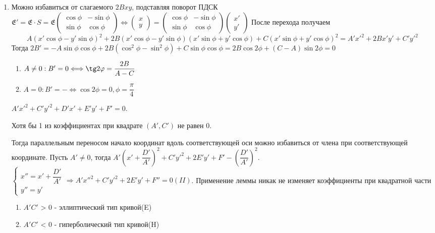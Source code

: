 \begin{enumerate}
	\item Можно избавиться от слагаемого \(2Bxy\), подставляя поворот ПДСК \(\mathfrak{E}' = \mathfrak{E}\cdot S = \mathfrak{E}\begin{pmatrix}
	\cos\phi & -\sin\phi \\
	\sin\phi & \cos\phi
	\end{pmatrix}\Longleftrightarrow \begin{pmatrix}
	x \\ y
	\end{pmatrix} = \begin{pmatrix}
	\cos\phi & -\sin\phi \\
	\sin\phi & \cos\phi
	\end{pmatrix} \begin{pmatrix}
	x' \\ y'
	\end{pmatrix}\) \newline
	После перехода получаем 
	\[A(x'\cos\phi-y'\sin\phi)^2+2B(x'\cos\phi-y'\sin\phi)(x'\sin\phi + y'\cos\phi) + C(x'\sin\phi+y'\cos\phi)^2 = A'x'^2+2Bx'y' + C'y'^2\]
	Тогда  \(2B' = -A\sin\phi\cos\phi + 2B(\cos^2\phi - \sin^2\phi)+C\sin\phi\cos\phi = 2B\cos2\phi + (C-A)\sin2\phi = 0\)
	\begin{enumerate}
		\item \(A\ne0: B' = 0\Longleftrightarrow \tg2\phi = \dfrac{2B}{A-C}\)
		\item \(A = 0: B' = -\Longleftrightarrow \cos2\phi= 0, \phi =\dfrac{\pi}{4}\)
	\end{enumerate}
	\(A'x'^2+C'y'^2+D'x'+E'y'+F' = 0\).
	\begin{lemma}
		Хотя бы 1 из коэффициентах при квадрате $(A', C')$ не равен 0.
	\end{lemma}
	Тогда параллельным переносом начало координат вдоль соответствующей оси можно избавиться от члена при соответствующей координате. Пусть \(A'\ne0\), тогда \(A'(x'+\dfrac{D'}{A'})^2+C'y'^2+2E'y'+F' - (\dfrac{D'}{A'})^2\).\(\left\{\begin{gathered}
		x'' = x' + \dfrac{D'}{A'} \\
		y'' = y'
	\end{gathered}\right.\Longrightarrow A'x''^2+C'y'^2+2E'y'+F'' = 0 (II)\).
	Применение леммы никак не изменяет коэффициенты при квадратной части
	\begin{enumerate}
		\item $A'C'$ > 0 - эллиптический тип кривой(E)
		\item $A'C'$ < 0 - гиперболический тип кривой(H)

\end{enumerate}
\end{enumerate}
